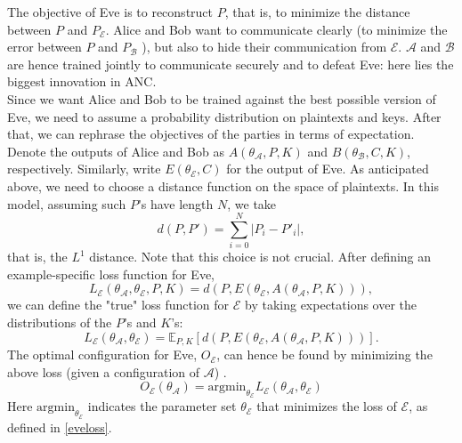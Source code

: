 \documentclass[%
    corpo=11pt,
    twoside,
    stile=classica,
    oldstyle,
    autoretitolo,
    tipotesi=magistrale,
    greek,
    evenboxes,
    english
]{toptesi}
\begin{document}
The objective of Eve is to reconstruct $P$, that is, to minimize the distance between $P$ and $P_{\mathcal{E}}$. Alice and Bob want to communicate clearly (to minimize the error between $P$ and $P_{\mathcal{B}}$ ), but also to hide their communication from $\mathcal{E}$. $\mathcal{A}$ and $\mathcal{B}$ are hence trained jointly to communicate securely and to defeat Eve: here lies the biggest innovation in ANC. \\
Since we want Alice and Bob to be trained against the best possible version of Eve, we need to assume a probability distribution on plaintexts and keys. After that, we can rephrase the objectives of the parties in terms of expectation. \\
Denote the outputs of Alice and Bob as $A(\theta_{\mathcal{A}}, P, K)$ and $B(\theta_{\mathcal{B}}, C, K)$, respectively. Similarly, write $E(\theta_{\mathcal{E}}, C)$ for the output of Eve. As anticipated above, we need to choose a distance function on the space of plaintexts. In this model, assuming such $P$'s have length $N$, we take
\begin{equation}
d(P,P') = \sum_{i=0}^{N}|P_i - P'_i|,
\end{equation}
that is, the $L^1$ distance. Note that this choice is not crucial.  After defining an example-specific loss function for Eve,
\begin{equation*}
L_{\mathcal{E}}\left(\theta_{\mathcal{A}}, \theta_{\mathcal{E}}, P, K \right) = d\left(P, E(\theta_{\mathcal{E}}, A(\theta_{\mathcal{A}}, P, K) ) \right),
\end{equation*}
we can define the "true" loss function for $\mathcal{E}$ by taking expectations over the distributions of the $P$'s and $K$'s:
\begin{equation}
\label{eveloss}
L_{\mathcal{E}}\left(\theta_{\mathcal{A}}, \theta_{\mathcal{E}}\right) = \mathbb{E}_{P,K} \left[ d\left(P, E(\theta_{\mathcal{E}}, A(\theta_{\mathcal{A}}, P, K) ) \right)\right].
\end{equation}
The optimal configuration for Eve, $O_{\mathcal{E}}$, can hence be found by minimizing the above loss (given a configuration of $\mathcal{A}$) .
\begin{equation}
O_{\mathcal{E}}\left(\theta_{\mathcal{A}} \right) = \textrm{argmin}_{\theta_{\mathcal{E}}}L_{\mathcal{E}}\left(\theta_{\mathcal{A}}, \theta_{\mathcal{E}}\right)
\end{equation}
Here $\textrm{argmin}_{\theta_{\mathcal{E}}}$ indicates the parameter set $\theta_{\mathcal{E}}$ that minimizes the loss of $\mathcal{E}$, as defined in \eqref{eveloss}.\\
\end{document}
